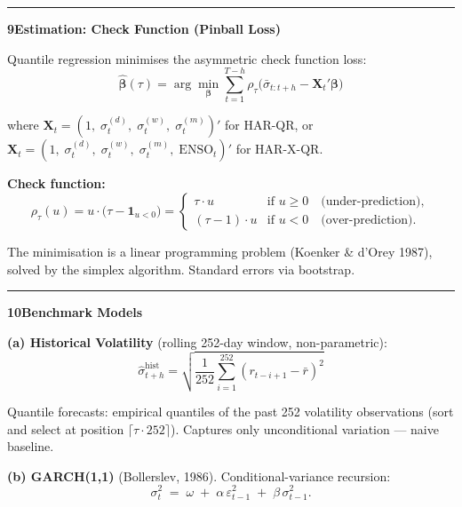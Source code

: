 \documentclass[10pt,a4paper]{article}
\newcommand{\sectionrule}{\vspace{0.3em}\hrule\vspace{0.5em}}
\begin{document}
\sectionrule

\textbf{9\quad Estimation: Check Function (Pinball Loss)}

Quantile regression minimises the asymmetric check function loss:
\begin{equation*}
\hat{\bm{\beta}}(\tau) = \arg\min_{\bm{\beta}} \sum_{t=1}^{T-h}
\rho_{\tau}\!\bigl(\bar{\sigma}_{t:t+h} - \bm{X}_t'\bm{\beta}\bigr)
\end{equation*}

where $\bm{X}_t = (1,\; \sigma_t^{(d)},\; \sigma_t^{(w)},\; \sigma_t^{(m)})'$
for HAR-QR, or
$\bm{X}_t = (1,\; \sigma_t^{(d)},\; \sigma_t^{(w)},\; \sigma_t^{(m)},\; \text{ENSO}_t)'$
for HAR-X-QR.

\textbf{Check function:}
\begin{equation*}
\rho_{\tau}(u) = u\cdot\bigl(\tau - \mathbf{1}_{u<0}\bigr)
=
\begin{cases}
\tau \cdot u        & \text{if } u \ge 0 \quad \text{(under-prediction)}, \\[4pt]
(\tau - 1)\cdot u   & \text{if } u < 0   \quad \text{(over-prediction)}.
\end{cases}
\end{equation*}

The minimisation is a linear programming problem (Koenker \& d'Orey 1987),
solved by the simplex algorithm. Standard errors via bootstrap.

\sectionrule

\textbf{10\quad Benchmark Models}

\textbf{(a) Historical Volatility} (rolling 252-day window, non-parametric):
\begin{equation*}
\hat{\sigma}_{t+h}^{\text{hist}} = \sqrt{\frac{1}{252}\sum_{i=1}^{252}(r_{t-i+1}-\bar{r})^2}
\end{equation*}

Quantile forecasts: empirical quantiles of the past 252 volatility
observations (sort and select at position $\lceil\tau\cdot 252\rceil$).
Captures only unconditional variation --- naive baseline.

\medskip
\textbf{(b) GARCH(1,1)} (Bollerslev, 1986).
Conditional-variance recursion:
\begin{equation*}
\sigma_t^2 \;=\; \omega \;+\; \alpha\,\varepsilon_{t-1}^2 \;+\; \beta\,\sigma_{t-1}^2.
\end{equation*}
\end{document}
